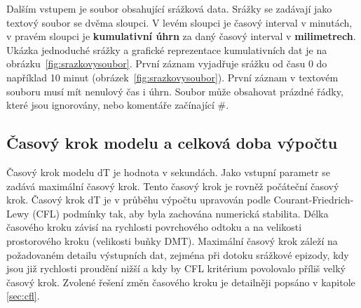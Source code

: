 Dalším vstupem je soubor obsahující srážková data. 
% 
% 
% 
Srážky se zadávají jako textový soubor se dvěma sloupci. V levém sloupci je časový interval v minutách, v pravém sloupci je \textbf{kumulativní úhrn} za daný časový interval v \textbf{milimetrech}. Ukázka jednoduché srážky a grafické reprezentace kumulativních dat je na obrázku~\ref{fig:srazkovysoubor}. První záznam vyjadřuje srážku od času 0 do například 10 minut (obrázek~\ref{fig:srazkovysoubor}). První záznam v textovém souboru musí mít nenulový čas i úhrn. Soubor může obsahovat prázdné řádky, které jsou ignorovány, nebo komentáře začínající \#. 














\subsection{Časový krok modelu a celková doba výpočtu} \label{sec:vstupkrok}

Časový krok modelu \acs{dT} je hodnota v sekundách. Jako vstupní parametr se zadává maximální časový krok. Tento časový krok je rovněž počáteční časový krok. Časový krok \acs{dT} je v průběhu výpočtu upravován podle Courant-Friedrich-Lewy (\acs{CFL}) podmínky tak, aby byla zachována numerická stabilita. Délka časového kroku závisí na rychlosti povrchového odtoku a na velikosti prostorového kroku (velikosti buňky DMT). Maximální časový krok záleží na požadovaném detailu výstupních dat, zejména při dotoku srážkové epizody, kdy jsou již rychlosti proudění nižší a kdy by \acs{CFL} kritérium povolovalo příliš velký časový krok. Zvolené řešení změn časového kroku je detailněji popsáno v kapitole \ref{sec:cfl}. 


